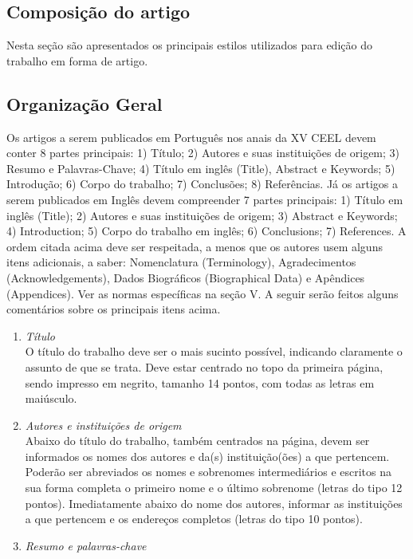 \documentclass{ceel}
\begin{document}
\begin{multicols}{2}
\section{Composição do artigo}
Nesta seção são apresentados os principais estilos utilizados para edição do trabalho em forma de artigo.
\subsection{Organização Geral}
Os artigos a serem publicados em Português nos anais da XV CEEL devem conter 8 partes principais: 1) Título; 2) Autores e suas instituições de origem; 3) Resumo e Palavras-Chave; 4) Título em inglês (Title), Abstract e Keywords; 5) Introdução; 6) Corpo do trabalho; 7) Conclusões; 8) Referências. 
Já os artigos a serem publicados em Inglês devem compreender 7 partes principais: 1) Título em inglês (Title); 2) Autores e suas instituições de origem; 3) Abstract e Keywords; 4) Introduction; 5) Corpo do trabalho em inglês; 6) Conclusions; 7) References. 
A ordem citada acima deve ser respeitada, a menos que os autores usem alguns itens adicionais, a saber: Nomenclatura (Terminology), Agradecimentos (Acknowledgements), Dados Biográficos (Biographical Data) e Apêndices (Appendices). Ver as normas específicas na seção V. 
A seguir serão feitos alguns comentários sobre os principais itens acima.
\begin{enumerate}
\item \emph{Título}\\
O título do trabalho deve ser o mais sucinto possível, indicando claramente o assunto de que se trata. Deve estar centrado no topo da primeira página, sendo impresso em negrito, tamanho 14 pontos, com todas as letras em maiúsculo.
\item \emph{Autores e instituições de origem}\\
Abaixo do título do trabalho, também centrados na página, devem ser informados os nomes dos autores e da(s) instituição(ões) a que pertencem. Poderão ser abreviados os nomes e sobrenomes intermediários e escritos na sua forma completa o primeiro nome e o último sobrenome (letras do tipo 12 pontos). Imediatamente abaixo do nome dos autores, informar as instituições a que pertencem e os endereços completos (letras do tipo 10 pontos).
\item \textit{Resumo e palavras-chave}\\

\end{enumerate}
\end{multicols}
\end{document}
